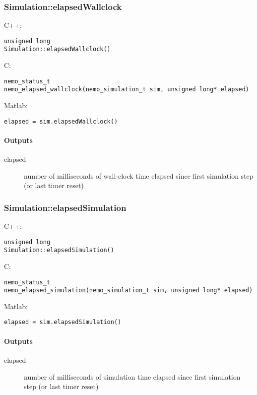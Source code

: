 \clearpage
\subsubsection*{Simulation::elapsedWallclock}
\label{fn: elapsedWallclock}



\noindent C++:
\begin{lstlisting}[aboveskip=2pt]
unsigned long
Simulation::elapsedWallclock()
\end{lstlisting}

\noindent C:
\begin{lstlisting}[aboveskip=2pt]
nemo_status_t
nemo_elapsed_wallclock(nemo_simulation_t sim, unsigned long* elapsed)
\end{lstlisting}

\noindent Matlab:
\begin{lstlisting}[aboveskip=2pt]
elapsed = sim.elapsedWallclock()
\end{lstlisting}
\paragraph{Outputs}
\begin{description}
\item[elapsed] number of milliseconds of wall-clock time elapsed since first simulation step (or last timer reset)
\end{description}

\clearpage
\subsubsection*{Simulation::elapsedSimulation}
\label{fn: elapsedSimulation}



\noindent C++:
\begin{lstlisting}[aboveskip=2pt]
unsigned long
Simulation::elapsedSimulation()
\end{lstlisting}

\noindent C:
\begin{lstlisting}[aboveskip=2pt]
nemo_status_t
nemo_elapsed_simulation(nemo_simulation_t sim, unsigned long* elapsed)
\end{lstlisting}

\noindent Matlab:
\begin{lstlisting}[aboveskip=2pt]
elapsed = sim.elapsedSimulation()
\end{lstlisting}
\paragraph{Outputs}
\begin{description}
\item[elapsed] number of milliseconds of simulation time elapsed since first simulation step (or last timer reset)
\end{description}

